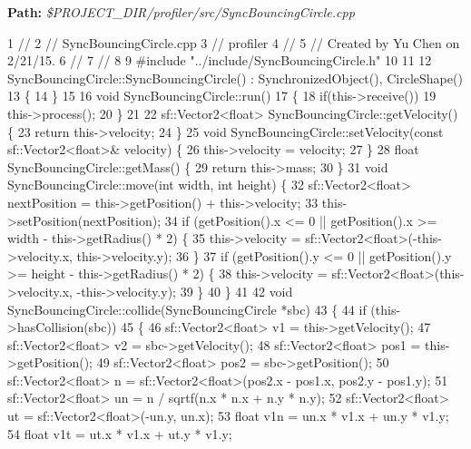 {\bfseries Path\+:} {\itshape \$\+P\+R\+O\+J\+E\+C\+T\+\_\+\+D\+I\+R/profiler/src/\+Sync\+Bouncing\+Circle.cpp} 
\begin{DoxyCodeInclude}
1 \textcolor{comment}{//}
2 \textcolor{comment}{//  SyncBouncingCircle.cpp}
3 \textcolor{comment}{//  profiler}
4 \textcolor{comment}{//}
5 \textcolor{comment}{//  Created by Yu Chen on 2/21/15.}
6 \textcolor{comment}{//}
7 \textcolor{comment}{//}
8 
9 \textcolor{preprocessor}{#include "../include/SyncBouncingCircle.h"}
10 
11 
12 SyncBouncingCircle::SyncBouncingCircle()  : SynchronizedObject(), CircleShape()
13 \{
14 \}
15 
16 \textcolor{keywordtype}{void} SyncBouncingCircle::run()
17 \{
18     \textcolor{keywordflow}{if}(this->receive())
19         this->process();
20 \}
21 
22 sf::Vector2<float> SyncBouncingCircle::getVelocity() \{
23     \textcolor{keywordflow}{return} this->velocity;
24 \}
25 \textcolor{keywordtype}{void} SyncBouncingCircle::setVelocity(\textcolor{keyword}{const} sf::Vector2<float>& velocity) \{
26     this->velocity = velocity;
27 \}
28 \textcolor{keywordtype}{float} SyncBouncingCircle::getMass() \{
29     \textcolor{keywordflow}{return} this->mass;
30 \}
31 \textcolor{keywordtype}{void} SyncBouncingCircle::move(\textcolor{keywordtype}{int} width, \textcolor{keywordtype}{int} height) \{
32     sf::Vector2<float> nextPosition = this->getPosition() + this->velocity;
33     this->setPosition(nextPosition);
34     \textcolor{keywordflow}{if} (getPosition().x <= 0 || getPosition().x >= width - this->getRadius() * 2) \{
35         this->velocity = sf::Vector2<float>(-this->velocity.x, this->velocity.y);
36     \}
37     \textcolor{keywordflow}{if} (getPosition().y <= 0 || getPosition().y >= height - this->getRadius() * 2) \{
38         this->velocity = sf::Vector2<float>(this->velocity.x, -this->velocity.y);
39     \}
40 \}
41 
42 \textcolor{keywordtype}{void} SyncBouncingCircle::collide(SyncBouncingCircle *sbc)
43 \{
44     \textcolor{keywordflow}{if} (this->hasCollision(sbc))
45     \{
46         sf::Vector2<float> v1 = this->getVelocity();
47         sf::Vector2<float> v2 = sbc->getVelocity();
48         sf::Vector2<float> pos1 = this->getPosition();
49         sf::Vector2<float> pos2 = sbc->getPosition();
50         sf::Vector2<float> n = sf::Vector2<float>(pos2.x - pos1.x, pos2.y - pos1.y);
51         sf::Vector2<float> un = n / sqrtf(n.x * n.x + n.y * n.y);
52         sf::Vector2<float> ut = sf::Vector2<float>(-un.y, un.x);
53         \textcolor{keywordtype}{float} v1n = un.x * v1.x + un.y * v1.y;
54         \textcolor{keywordtype}{float} v1t = ut.x * v1.x + ut.y * v1.y;

\end{DoxyCodeInclude}
